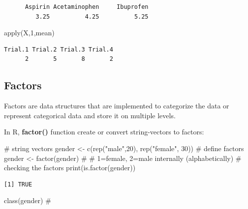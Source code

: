 \documentclass[
  letterpaper,
  DIV=11,
  numbers=noendperiod]{scrreprt}
\newenvironment{Shaded}{\begin{snugshade}}{\end{snugshade}}
\newcommand{\CommentTok}[1]{\textcolor[rgb]{0.37,0.37,0.37}{#1}}
\newcommand{\DecValTok}[1]{\textcolor[rgb]{0.68,0.00,0.00}{#1}}
\newcommand{\FunctionTok}[1]{\textcolor[rgb]{0.28,0.35,0.67}{#1}}
\newcommand{\NormalTok}[1]{\textcolor[rgb]{0.00,0.23,0.31}{#1}}
\newcommand{\OtherTok}[1]{\textcolor[rgb]{0.00,0.23,0.31}{#1}}
\newcommand{\StringTok}[1]{\textcolor[rgb]{0.13,0.47,0.30}{#1}}
\begin{document}
\begin{verbatim}
      Aspirin Acetaminophen     Ibuprofen 
         3.25          4.25          5.25 
\end{verbatim}

\begin{Shaded}
\begin{Highlighting}[]
\FunctionTok{apply}\NormalTok{(X,}\DecValTok{1}\NormalTok{,mean)}
\end{Highlighting}
\end{Shaded}

\begin{verbatim}
Trial.1 Trial.2 Trial.3 Trial.4 
      2       5       8       2 
\end{verbatim}

\hypertarget{factors}{%
\subsection{Factors}\label{factors}}

Factors are data structures that are implemented to categorize the data
or represent categorical data and store it on multiple levels.

In R, \textbf{factor()} function create or convert string-vectors to
factors:

\begin{Shaded}
\begin{Highlighting}[]
\CommentTok{\# string vectors}
\NormalTok{gender }\OtherTok{\textless{}{-}} \FunctionTok{c}\NormalTok{(}\FunctionTok{rep}\NormalTok{(}\StringTok{"male"}\NormalTok{,}\DecValTok{20}\NormalTok{), }\FunctionTok{rep}\NormalTok{(}\StringTok{"female"}\NormalTok{, }\DecValTok{30}\NormalTok{))}
\CommentTok{\# define factors}
\NormalTok{gender }\OtherTok{\textless{}{-}} \FunctionTok{factor}\NormalTok{(gender) }\CommentTok{\# \# 1=female, 2=male internally (alphabetically)}
\CommentTok{\# checking the factors}
\FunctionTok{print}\NormalTok{(}\FunctionTok{is.factor}\NormalTok{(gender))}
\end{Highlighting}
\end{Shaded}

\begin{verbatim}
[1] TRUE
\end{verbatim}

\begin{Shaded}
\begin{Highlighting}[]
\FunctionTok{class}\NormalTok{(gender) }\CommentTok{\# }
\end{Highlighting}
\end{Shaded}
\end{document}
